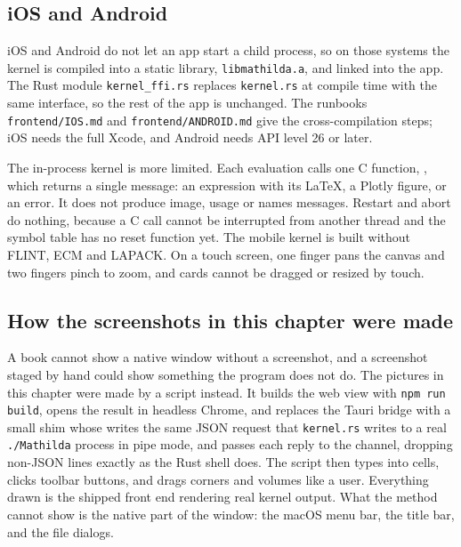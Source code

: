 \subsection{iOS and Android}
\label{sec:nb-mobile}

iOS and Android do not let an app start a child process, so on those systems
the kernel is compiled into a static library, \texttt{libmathilda.a}, and
linked into the app. The Rust module \texttt{kernel\_ffi.rs} replaces
\texttt{kernel.rs} at compile time with the same interface, so the rest of the
app is unchanged. The runbooks \texttt{frontend/IOS.md} and
\texttt{frontend/ANDROID.md} give the cross-compilation steps; iOS needs the
full Xcode, and Android needs API level 26 or later.

\begin{sloppypar}
The in-process kernel is more limited. Each evaluation calls one C function,
, which returns a single message: an
expression with its \LaTeX{}, a Plotly figure, or an error. It does not
produce image, usage or names messages. Restart and abort do nothing, because
a C call cannot be interrupted from another thread and the symbol table has
no reset function yet. The mobile kernel is built without FLINT, ECM and
LAPACK. On a touch screen, one finger pans the canvas and two fingers pinch
to zoom, and cards cannot be dragged or resized by touch.
\end{sloppypar}

\subsection{How the screenshots in this chapter were made}
\label{sec:nb-screenshots}

A book cannot show a native window without a screenshot, and a screenshot
staged by hand could show something the program does not do. The pictures in
this chapter were made by a script instead. It builds the web view with
\texttt{npm run build}, opens the result in headless Chrome, and replaces the
Tauri bridge with a small shim whose  writes the same
JSON request that \texttt{kernel.rs} writes to a real \texttt{./Mathilda}
process in pipe mode, and passes each reply to the channel, dropping non-JSON
lines exactly as the Rust shell does. The script then types into cells,
clicks toolbar buttons, and drags corners and volumes like a user. Everything
drawn is the shipped front end rendering real kernel output. What the method
cannot show is the native part of the window: the macOS menu bar, the title
bar, and the file dialogs.

